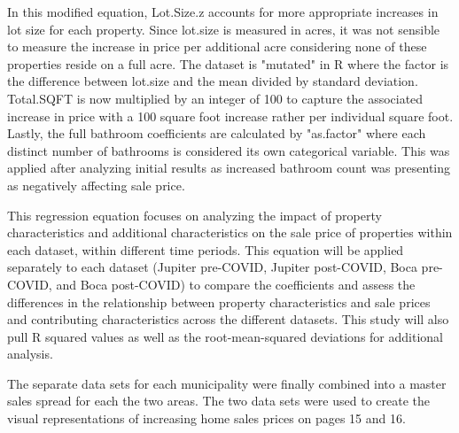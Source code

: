 \documentclass[12pt,english]{article}
\begin{document}
In this modified equation, Lot.Size.z accounts for more appropriate increases in lot size for each property. Since lot.size is measured in acres, it was not sensible to measure the increase in price per additional acre considering none of these properties reside on a full acre. The dataset is "mutated" in R where the factor is the difference between lot.size and the mean divided by standard deviation. Total.SQFT is now multiplied by an integer of 100 to capture the associated increase in price with a 100 square foot increase rather per individual square foot. Lastly, the full bathroom coefficients are calculated by "as.factor" where each distinct number of bathrooms is considered its own categorical variable. This was applied after analyzing initial results as increased bathroom count was presenting as negatively affecting sale price. 

This regression equation focuses on analyzing the impact of property characteristics and additional characteristics on the sale price of properties within each dataset, within different time periods. This equation will be applied separately to each dataset (Jupiter pre-COVID, Jupiter post-COVID, Boca pre-COVID, and Boca post-COVID) to compare the coefficients and assess the differences in the relationship between property characteristics and sale prices and contributing characteristics across the different datasets. This study will also pull R squared values as well as the root-mean-squared deviations for additional analysis. 

The separate data sets for each municipality were finally combined into a master sales spread for each the two areas. The two data sets were used to create the visual representations of increasing home sales prices on pages 15 and 16.
\end{document}
